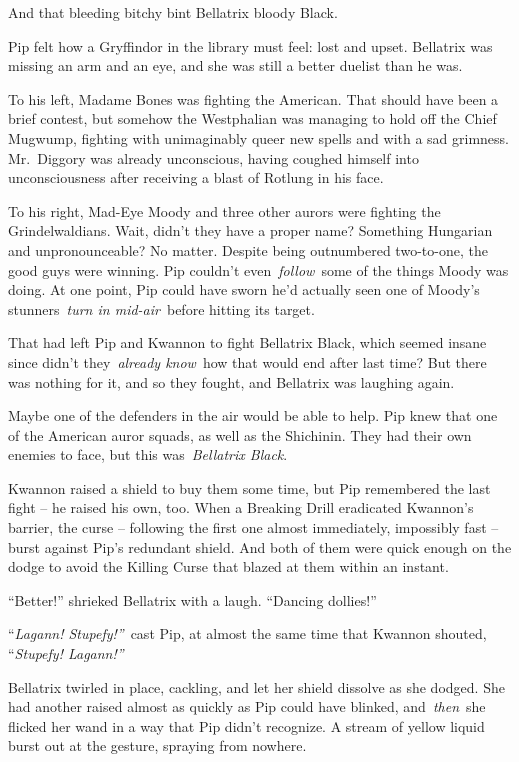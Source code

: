 And that bleeding bitchy bint Bellatrix bloody Black.

Pip felt how a Gryffindor in the library must feel: lost and upset.
Bellatrix was missing an arm and an eye, and she was still a better
duelist than he was.

To his left, Madame Bones was fighting the American. That should have
been a brief contest, but somehow the Westphalian was managing to hold
off the Chief Mugwump, fighting with unimaginably queer new spells and
with a sad grimness. Mr.~Diggory was already unconscious, having coughed
himself into unconsciousness after receiving a blast of Rotlung in his
face.

To his right, Mad-Eye Moody and three other aurors were fighting the
Grindelwaldians. Wait, didn't they have a proper name? Something
Hungarian and unpronounceable? No matter. Despite being outnumbered
two-to-one, the good guys were winning. Pip couldn't
even~\emph{follow}~some of the things Moody was doing. At one point, Pip
could have sworn he'd actually seen one of Moody's stunners~\emph{turn
in mid-air}~before hitting its target.

That had left Pip and Kwannon to fight Bellatrix Black, which seemed
insane since didn't they~\emph{already know}~how that would end after
last time? But there was nothing for it, and so they fought, and
Bellatrix was laughing again.

Maybe one of the defenders in the air would be able to help. Pip knew
that one of the American auror squads, as well as the Shichinin. They
had their own enemies to face, but this was~\emph{Bellatrix Black}.

Kwannon raised a shield to buy them some time, but Pip remembered the
last fight -- he raised his own, too. When a Breaking Drill eradicated
Kwannon's barrier, the curse -- following the first one almost
immediately, impossibly fast -- burst against Pip's redundant shield.
And both of them were quick enough on the dodge to avoid the Killing
Curse that blazed at them within an instant.

``Better!'' shrieked Bellatrix with a laugh. ``Dancing dollies!''

``\emph{Lagann! Stupefy!''}~cast Pip, at almost the same time that
Kwannon shouted, ``\emph{Stupefy! Lagann!''}

Bellatrix twirled in place, cackling, and let her shield dissolve as she
dodged. She had another raised almost as quickly as Pip could have
blinked, and~\emph{then}~she flicked her wand in a way that Pip didn't
recognize. A stream of yellow liquid burst out at the gesture, spraying
from nowhere.

